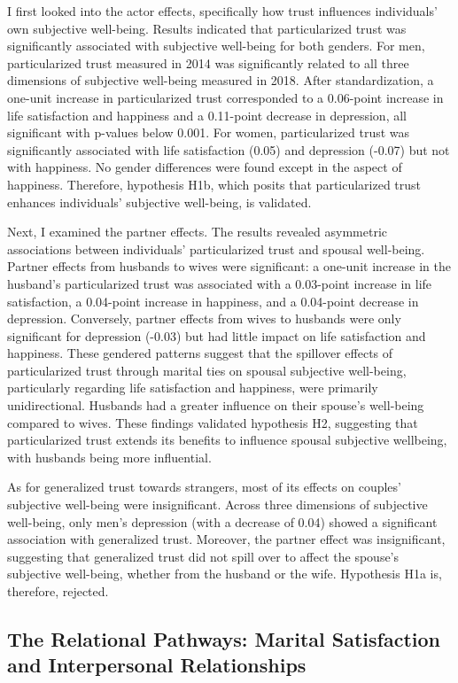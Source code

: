 I first looked into the actor effects, specifically how trust influences individuals' own subjective well-being. Results indicated that particularized trust was significantly associated with subjective well-being for both genders. For men, particularized trust measured in 2014 was significantly related to all three dimensions of subjective well-being measured in 2018. After standardization, a one-unit increase in particularized trust corresponded to a 0.06-point increase in life satisfaction and happiness and a 0.11-point decrease in depression, all significant with p-values below 0.001. For women, particularized trust was significantly associated with life satisfaction (0.05) and depression (-0.07) but not with happiness. No gender differences were found except in the aspect of happiness. Therefore, hypothesis H1b, which posits that particularized trust enhances individuals' subjective well-being, is validated.

Next, I examined the partner effects. The results revealed asymmetric associations between individuals' particularized trust and spousal well-being. Partner effects from husbands to wives were significant: a one-unit increase in the husband's particularized trust was associated with a 0.03-point increase in life satisfaction, a 0.04-point increase in happiness, and a 0.04-point decrease in depression. Conversely, partner effects from wives to husbands were only significant for depression (-0.03) but had little impact on life satisfaction and happiness. These gendered patterns suggest that the spillover effects of particularized trust through marital ties on spousal subjective well-being, particularly regarding life satisfaction and happiness, were primarily unidirectional. Husbands had a greater influence on their spouse's well-being compared to wives. These findings validated hypothesis H2, suggesting that particularized trust extends its benefits to influence spousal subjective wellbeing, with husbands being more influential.

As for generalized trust towards strangers, most of its effects on couples' subjective well-being were insignificant. Across three dimensions of subjective well-being, only men's depression (with a decrease of 0.04) showed a significant association with generalized trust. Moreover, the partner effect was insignificant, suggesting that generalized trust did not spill over to affect the spouse's subjective well-being, whether from the husband or the wife. Hypothesis H1a is, therefore, rejected.

\subsection{The Relational Pathways: Marital Satisfaction and Interpersonal Relationships}

